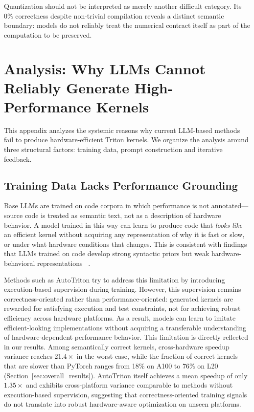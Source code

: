 Quantization should not be interpreted as merely another difficult category. Its 0\% correctness despite non-trivial compilation reveals a distinct semantic boundary: models do not reliably treat the numerical contract itself as part of the computation to be preserved.

\section{Analysis: Why LLMs Cannot Reliably Generate High-Performance Kernels}
\label{app:analysis}

This appendix analyzes the systemic reasons why current LLM-based methods fail to produce hardware-efficient Triton kernels.
We organize the analysis around three structural factors: training data, prompt construction and iterative feedback.

\subsection{Training Data Lacks Performance Grounding}

Base LLMs are trained on code corpora in which performance is not annotated---source code is treated as semantic text, not as a description of hardware behavior.
A model trained in this way can learn to produce code that \emph{looks like} an efficient kernel without acquiring any representation of why it is fast or slow, or under what hardware conditions that changes. This is consistent with findings that LLMs trained on code develop strong syntactic priors but weak hardware-behavioral representations ~\cite{chen2021evaluating}.

Methods such as AutoTriton try to address this limitation by introducing execution-based supervision during training. However, this supervision remains correctness-oriented rather than performance-oriented: generated kernels are rewarded for satisfying execution and test constraints, not for achieving robust efficiency across hardware platforms. As a result, models can learn to imitate efficient-looking implementations without acquiring a transferable understanding of hardware-dependent performance behavior.
This limitation is directly reflected in our results. Among semantically correct kernels, cross-hardware speedup variance reaches $21.4\times$ in the worst case, while the fraction of correct kernels that are slower than PyTorch ranges from 18\% on A100 to 76\% on L20 (Section~\ref{sec:overall_results}). AutoTriton itself achieves a mean speedup of only $1.35\times$ and exhibits cross-platform variance comparable to methods without execution-based supervision, suggesting that correctness-oriented training signals do not translate into robust hardware-aware optimization on unseen platforms.

